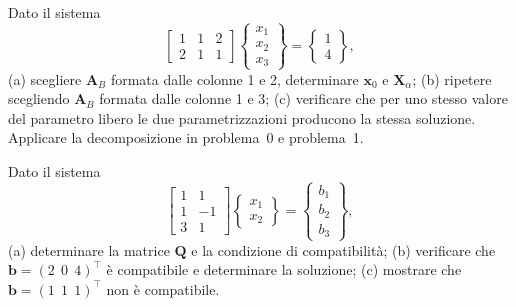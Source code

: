 \begin{esercizio} 
	Dato il sistema
	\begin{equation*}
		\begin{bmatrix} 1 & 1 & 2 \\ 2 & 1 & 1 \end{bmatrix}
		\begin{Bmatrix} x_1 \\ x_2 \\ x_3 \end{Bmatrix}
		= \begin{Bmatrix} 1 \\ 4 \end{Bmatrix},
	\end{equation*}
	(a) scegliere $\bm{A}_B$ formata dalle colonne 1 e 2, determinare
	$\bm{x}_0$ e $\bm{X}_\alpha$; (b) ripetere scegliendo $\bm{A}_B$
	formata dalle colonne 1 e 3; (c) verificare che per uno stesso
	valore del parametro libero le due parametrizzazioni producono la
	stessa soluzione. Applicare la decomposizione in problema~0 e
	problema~1.
\end{esercizio} 

\begin{esercizio} 
	Dato il sistema
	\begin{equation*}
		\begin{bmatrix} 1 & 1 \\ 1 & -1 \\ 3 & 1 \end{bmatrix}
		\begin{Bmatrix} x_1 \\ x_2 \end{Bmatrix}
		= \begin{Bmatrix} b_1 \\ b_2 \\ b_3 \end{Bmatrix},
	\end{equation*}
	(a) determinare la matrice $\bm{Q}$ e la condizione di compatibilit\`a;
	(b) verificare che $\bm{b}=(2\,\;0\,\;4)^\top$ \`e compatibile e
	determinare la soluzione; (c) mostrare che
	$\bm{b}=(1\,\;1\,\;1)^\top$ non \`e compatibile.
\end{esercizio} 

